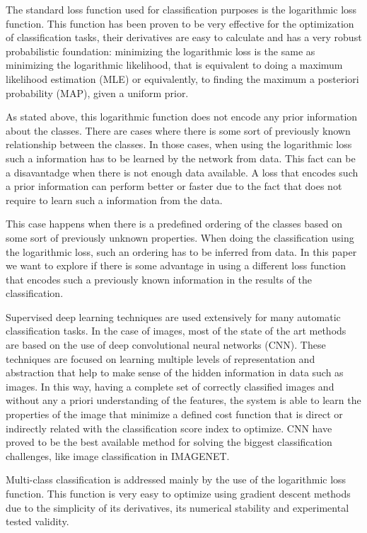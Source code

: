 \documentclass{IOS-Book-Article}
\begin{document}
The standard loss function used for classification purposes is the logarithmic loss function. This function has been proven to be very effective for the optimization of classification tasks, their derivatives are easy to calculate and has a very robust probabilistic foundation: minimizing the logarithmic loss is the same as minimizing the logarithmic likelihood, that is equivalent to doing a maximum likelihood estimation (MLE) or equivalently, to finding the maximum a posteriori probability (MAP), given a uniform prior. 

As stated above, this logarithmic function does not encode any prior information about the classes. There are cases where there is some sort of previously known relationship between the classes. In those cases, when using the logarithmic loss such a information has to be learned by the network from data. This fact can be a disavantadge when there is not enough data available. A loss that encodes such a prior information can perform better or faster due to the fact that does not require to learn such a information from the data.

This case happens when there is a predefined ordering of the classes based on some sort of previously unknown properties. When doing the classification using the logarithmic loss, such an ordering has to be inferred from data. In this paper we want to explore if there is some advantage in using a different loss function that encodes such a previously known information in the results of the classification.

Supervised deep learning techniques are used extensively for many automatic classification tasks. In the case of images, most of the state of the art methods are based on the use of deep convolutional neural networks (CNN). These techniques are focused on learning multiple levels of representation and abstraction that help to make sense of the hidden information in data such as images. In this way, having a complete set of correctly classified images and without any a priori understanding of the features, the system is able to learn the properties of the image that minimize a defined cost function that is direct or indirectly related with the classification score index to optimize. CNN have proved to be the best available method for solving the biggest classification challenges, like image classification in IMAGENET\cite{ILSVRC15}. 

Multi-class classification is addressed mainly by the use of the logarithmic loss function. This function is very easy to optimize using gradient descent methods due to the simplicity of its derivatives, its numerical stability and experimental tested validity.
\end{document}
